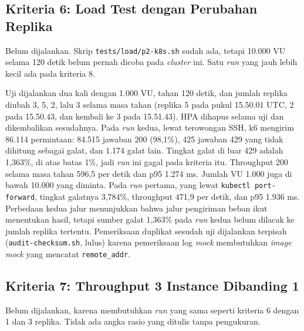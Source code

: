 
\subsection{Kriteria 6: Load Test dengan Perubahan Replika}

Belum dijalankan. Skrip \texttt{tests/load/p2-k8s.sh} sudah ada, tetapi 10.000 VU selama 120 detik belum pernah dicoba pada \textit{cluster} ini. Satu \textit{run} yang jauh lebih kecil ada pada kriteria 8.

Uji dijalankan dua kali dengan 1.000 VU, tahan 120 detik, dan jumlah replika diubah 3, 5, 2, lalu 3 selama masa tahan (replika 5 pada pukul 15.50.01 UTC, 2 pada 15.50.43, dan kembali ke 3 pada 15.51.43). HPA dihapus selama uji dan dikembalikan sesudahnya. Pada \textit{run} kedua, lewat terowongan SSH, k6 mengirim 86.114 permintaan: 84.515 jawaban 200 (98,1\%), 425 jawaban 429 yang tidak dihitung sebagai galat, dan 1.174 galat lain. Tingkat galat di luar 429 adalah 1,363\%, di atas batas 1\%, jadi \textit{run} ini gagal pada kriteria itu. Throughput 200 selama masa tahan 596,5 per detik dan p95 1.274 ms. Jumlah VU 1.000 juga di bawah 10.000 yang diminta. Pada \textit{run} pertama, yang lewat \texttt{kubectl port-forward}, tingkat galatnya 3,784\%, throughput 471,9 per detik, dan p95 1.936 ms. Perbedaan kedua jalur menunjukkan bahwa jalur pengiriman beban ikut menentukan hasil, tetapi sumber galat 1,363\% pada \textit{run} kedua belum dilacak ke jumlah replika tertentu. Pemeriksaan duplikat sesudah uji dijalankan terpisah (\texttt{audit-checksum.sh}, lulus) karena pemeriksaan log \textit{mock} membutuhkan \textit{image} \textit{mock} yang mencatat \texttt{remote\_addr}.


\subsection{Kriteria 7: Throughput 3 Instance Dibanding 1}

Belum dijalankan, karena membutuhkan \textit{run} yang sama seperti kriteria 6 dengan 1 dan 3 replika. Tidak ada angka rasio yang ditulis tanpa pengukuran.


